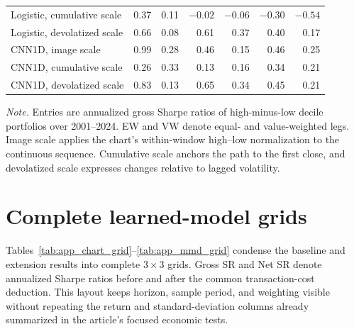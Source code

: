 \begin{table}[htbp]
\begin{tabular}{@{}lrrrrrr@{}}
Logistic, cumulative scale & 0.37 & 0.11 & $-0.02$ & $-0.06$ & $-0.30$ & $-0.54$ \\
Logistic, devolatized scale & 0.66 & 0.08 & 0.61 & 0.37 & 0.40 & 0.17 \\
CNN1D, image scale & 0.99 & 0.28 & 0.46 & 0.15 & 0.46 & 0.25 \\
CNN1D, cumulative scale & 0.26 & 0.33 & 0.13 & 0.16 & 0.34 & 0.21 \\
CNN1D, devolatized scale & 0.83 & 0.13 & 0.65 & 0.34 & 0.45 & 0.21 \\
\bottomrule
\end{tabular}
\begin{minipage}{\textwidth}
\footnotesize\textit{Note.} Entries are annualized gross Sharpe ratios of high-minus-low decile portfolios over 2001--2024. EW and VW denote equal- and value-weighted legs. Image scale applies the chart's within-window high--low normalization to the continuous sequence. Cumulative scale anchors the path to the first close, and devolatized scale expresses changes relative to lagged volatility.
\end{minipage}
\end{table}

\FloatBarrier

\section{Complete learned-model grids}\label{app:learned_grids}

Tables~\ref{tab:app_chart_grid}--\ref{tab:app_mmd_grid} condense the baseline and extension results into complete $3\times3$ grids. Gross SR and Net SR denote annualized Sharpe ratios before and after the common transaction-cost deduction. This layout keeps horizon, sample period, and weighting visible without repeating the return and standard-deviation columns already summarized in the article's focused economic tests.

